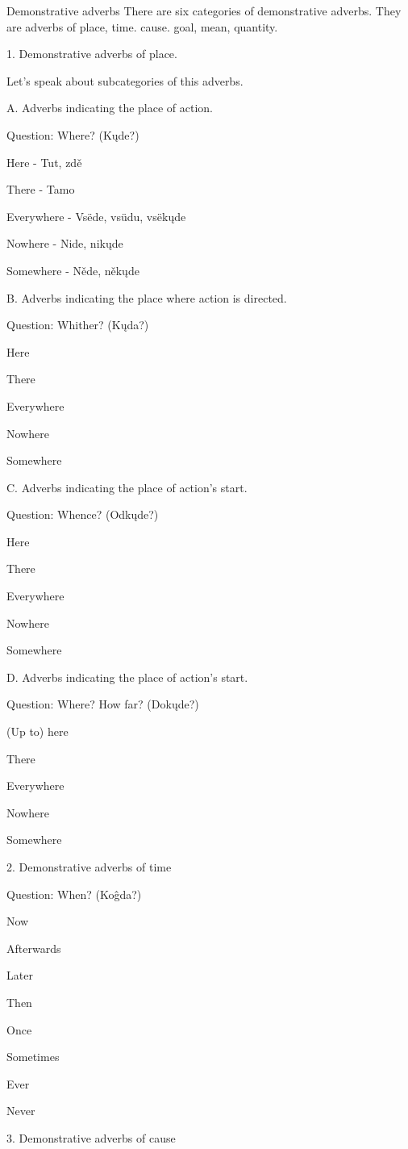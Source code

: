 Demonstrative adverbs
There are six categories of demonstrative adverbs. They are adverbs of place, time. cause. goal, mean, quantity.

1. Demonstrative adverbs of place.

Let’s speak about subcategories of this adverbs. 

A. Adverbs indicating the place of action.

Question: Where? (Kųde?)

Here - Tut, zdě

There - Tamo

Everywhere - Vsëde, vsüdu, vsëkųde

Nowhere - Nide, nikųde

Somewhere - Něde, někųde

B. Adverbs indicating the place where action is directed. 

Question: Whither? (Kųda?)

Here

There

Everywhere

Nowhere

Somewhere


C. Adverbs indicating the place of action’s start.

Question: Whence? (Odkųde?)

Here

There

Everywhere

Nowhere

Somewhere


D. Adverbs indicating the place of action’s start.

Question: Where? How far? (Dokųde?)

(Up to) here

There

Everywhere

Nowhere

Somewhere


2. Demonstrative adverbs of time

Question: When? (Koĝda?)

Now

Afterwards

Later

Then

Once

Sometimes

Ever

Never


3. Demonstrative adverbs of cause

